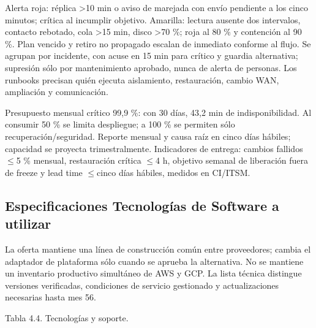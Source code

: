 \documentclass[11pt,letterpaper]{report}
\begin{document}
Alerta roja: réplica >10 min o aviso de marejada con envío pendiente a los cinco minutos; crítica al incumplir objetivo. Amarilla: lectura ausente dos intervalos, contacto rebotado, cola >15 min, disco >70 \%; roja al 80 \% y contención al 90 \%. Plan vencido y retiro no propagado escalan de inmediato conforme al flujo. Se agrupan por incidente, con acuse en 15 min para crítico y guardia alternativa; supresión sólo por mantenimiento aprobado, nunca de alerta de personas. Los runbooks precisan quién ejecuta aislamiento, restauración, cambio WAN, ampliación y comunicación.

Presupuesto mensual crítico 99,9 \%: con 30 días, 43,2 min de indisponibilidad. Al consumir 50 \% se limita despliegue; a 100 \% se permiten sólo recuperación/seguridad. Reporte mensual y causa raíz en cinco días hábiles; capacidad se proyecta trimestralmente. Indicadores de entrega: cambios fallidos $\leq$5 \% mensual, restauración crítica $\leq$4 h, objetivo semanal de liberación fuera de freeze y lead time $\leq$cinco días hábiles, medidos en CI/ITSM.

\subsection{Especificaciones Tecnologías de Software a utilizar}
La oferta mantiene una línea de construcción común entre proveedores; cambia el adaptador de plataforma sólo cuando se aprueba la alternativa. No se mantiene un inventario productivo simultáneo de AWS y GCP. La lista técnica distingue versiones verificadas, condiciones de servicio gestionado y actualizaciones necesarias hasta mes 56.

Tabla 4.4. Tecnologías y soporte.
\end{document}
